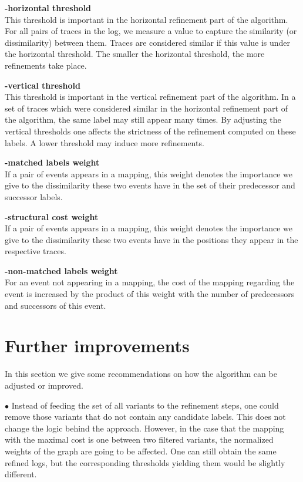 \documentclass[notitlepage]{article}
\begin{document}
\begin{flushleft}
\textbf{-horizontal threshold}\\
This threshold is important in the horizontal refinement part of the algorithm.
For all pairs of traces in the log, we measure a value to capture the similarity (or dissimilarity) between them.
Traces are considered similar if this value is under the horizontal threshold.
The smaller the horizontal threshold, the more refinements take place.
\medskip

\textbf{-vertical threshold}\\
This threshold is important in the vertical refinement part of the algorithm.
In a set of traces which were considered similar in the horizontal refinement part of the algorithm, the same label may still appear many times.
By adjusting the vertical thresholds one affects the strictness of the refinement computed on these labels.
A lower threshold may induce more refinements.
\medskip

\textbf{-matched labels weight}\\
If a pair of events appears in a mapping, this weight denotes the importance we give to the dissimilarity these two events have in the set of their predecessor and successor labels.
\medskip

\textbf{-structural cost weight}\\
If a pair of events appears in a mapping, this weight denotes the importance we give to the dissimilarity these two events have in the positions they appear in the respective traces.
\medskip

\textbf{-non-matched labels weight}\\
For an event not appearing in a mapping, the cost of the mapping regarding the event is increased by the product of this weight with the number of predecessors and successors of this event.
\medskip


\section{Further improvements}
In this section we give some recommendations on how the algorithm can be adjusted or improved.
\medskip

$\bullet$
Instead of feeding the set of all variants to the refinement steps, one could remove those variants that do not contain any candidate labels.
This does not change the logic behind the approach.
However, in the case that the mapping with the maximal cost is one between two filtered variants, the normalized weights of the graph are going to be affected.
One can still obtain the same refined logs, but the corresponding thresholds yielding them would be slightly different.
\medskip


\end{flushleft}
\end{document}
